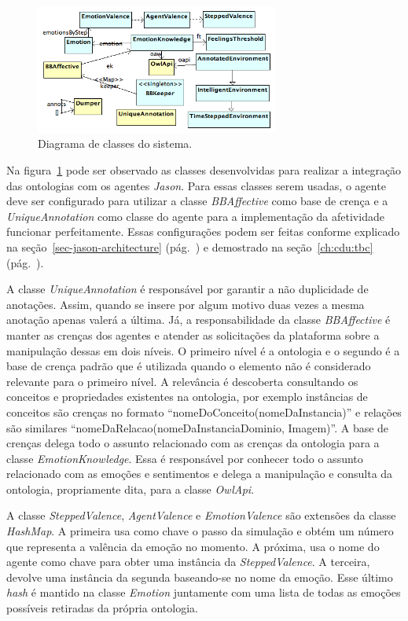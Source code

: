 \begin{figure}[b]
  \centering
  \includegraphics[width=8cm]{figuras/implementacao-15dez2011.png}
  \caption{Diagrama de classes do sistema.}
  \label{fig:dcs}
\end{figure}

Na figura~\ref{fig:dcs} pode ser observado as classes desenvolvidas para
realizar a integração das ontologias com os agentes \emph{Jason}. Para essas classes
serem usadas, o agente deve ser configurado para utilizar a classe
\emph{BBAffective} como base de crença e a \emph{UniqueAnnotation} como classe
do agente para a implementação da afetividade funcionar perfeitamente. Essas
configurações podem ser feitas conforme explicado na
seção~\ref{sec-jason-architecture} (pág.~\pageref{sec-jason-architecture}) e
demostrado na seção~\ref{ch:cdu:tbc} (pág.~\pageref{ch:cdu:tbc}).

A classe \emph{UniqueAnnotation} é responsável por garantir a não duplicidade
de anotações. Assim, quando se insere por algum motivo duas vezes a mesma
anotação apenas valerá a última. Já, a responsabilidade da classe
\emph{BBAffective} é manter as crenças dos agentes e atender as solicitações
da plataforma \jason sobre a manipulação dessas em dois níveis. O primeiro
nível é a ontologia e o segundo é a base de crença padrão que é utilizada
quando o elemento não é considerado relevante para o primeiro nível. A
relevância é descoberta consultando os conceitos e propriedades existentes na
ontologia, por exemplo instâncias de conceitos são crenças no formato
``nomeDoConceito(nomeDaInstancia)'' e relações são similares
``nomeDaRelacao(nomeDaInstanciaDominio, Imagem)''. A base de crenças delega
todo o assunto relacionado com as crenças da ontologia para a classe
\emph{EmotionKnowledge}. Essa é responsável por conhecer todo o assunto
relacionado com as emoções e sentimentos e delega a manipulação e consulta da
ontologia, propriamente dita, para a classe \emph{OwlApi}.

A classe \emph{SteppedValence}, \emph{AgentValence} e \emph{EmotionValence}
são extensões da classe \emph{HashMap}. A primeira usa como chave o passo da
simulação e obtém um número que representa a valência da emoção no momento. A
próxima, usa o nome do agente como chave para obter uma instância da
\emph{SteppedValence}. A terceira, devolve uma instância da segunda
baseando-se no nome da emoção. Esse último \emph{hash} é mantido na classe
\emph{Emotion} juntamente com uma lista de todas as emoções possíveis
retiradas da própria ontologia.

